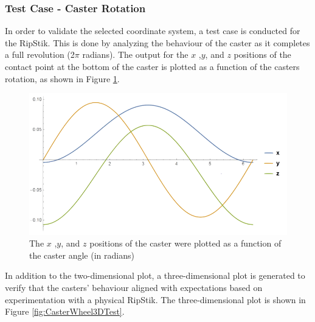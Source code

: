 \subsubsection{Test Case - Caster Rotation}

In order to validate the selected coordinate system, a test case is conducted for the RipStik. This is done by analyzing the behaviour of the caster as it completes a full revolution (2$\pi$ radians).
The output for the $x$ ,$y$, and $z$ positions of the contact point at the bottom of the caster is plotted as a function of the casters rotation, as shown in Figure \ref{fig:CasterWheel2DTest}.

\begin{figure}[!htb]
	\centering
	\includegraphics[width=\linewidth]{CasterWheel2DTest.png}
	\caption{The $x$ ,$y$, and $z$ positions of the caster were plotted as a function of the caster angle (in radians)}\label{fig:CasterWheel2DTest}
	\endminipage
\end{figure} 

In addition to the two-dimensional plot, a three-dimensional plot is generated to verify that the casters' behaviour aligned with expectations based on experimentation with a physical RipStik. The three-dimensional plot is shown in Figure \ref{fig:CasterWheel3DTest}.

